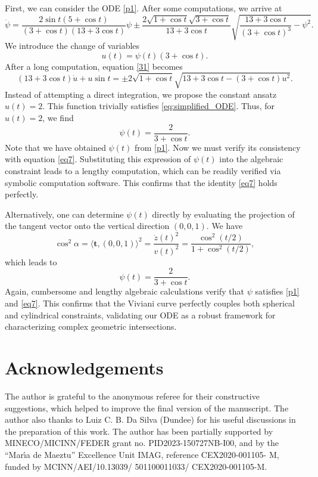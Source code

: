 \documentclass[a4paper,12pt]{amsart}
\theoremstyle{plain}
\theoremstyle{definition}
\newcommand{\bft}{\mathbf{t}}
\begin{document}
First, we can consider the ODE \eqref{p1}. After some computations, we arrive at 
\begin{equation} \label{31}
    \dot{\psi} = \frac{2\sin t (5 + \cos t)}{(3 + \cos t)(13 + 3\cos t)} \psi \pm \frac{2 \sqrt{1 + \cos t} \sqrt{3 + \cos t}}{13 + 3\cos t} \sqrt{ \frac{13 + 3\cos t}{(3 + \cos t)^3} - \psi^2 }.
\end{equation}
We introduce the change of variables 
$$u(t)=\psi(t)(3+\cos t).$$
After a long computation, equation   \eqref{31} becomes 
\begin{equation} \label{eq:simplified_ODE}
    (13 + 3\cos t)\dot{u} + u\sin t = \pm 2\sqrt{1 + \cos t} \sqrt{ 13 + 3\cos t - (3 + \cos t)u^2 }.
\end{equation} 
 Instead of attempting a direct integration, we propose the constant  ansatz    $u(t) = 2$. This function trivially satisfies \eqref{eq:simplified_ODE}.  Thus, for $u(t)=2$, we find
\begin{equation*}
    \psi(t) = \frac{2}{3 + \cos t}.
\end{equation*}
Note that we have obtained $\psi(t)$ from \eqref{p1}. Now we must verify its consistency with equation \eqref{eq7}. Substituting this expression of $\psi(t)$ into the algebraic constraint leads to a lengthy computation, which can be readily verified via symbolic computation software. This confirms that the identity \eqref{eq7} holds perfectly.

Alternatively,   one can determine $\psi(t)$ directly  by evaluating the projection of the tangent vector onto the vertical direction $(0,0,1)$. We have 
\begin{equation*}
    \cos^2 \alpha = \langle \bft, (0,0,1) \rangle^2 = \frac{\dot{z}(t)^2}{v(t)^2} = \frac{\cos^2(t/2)}{1 + \cos^2(t/2)},
\end{equation*}
which leads to 
\[     \psi(t) =  \frac{2}{3 + \cos t}.\]
  Again,     cumbersome and lengthy algebraic calculations verify that $\psi$ satisfies \eqref{p1} and \eqref{eq7}.  
 This  confirms that the Viviani curve perfectly couples both spherical and cylindrical constraints, validating our ODE as a robust framework for characterizing complex geometric intersections.
   
   
  

\section*{Acknowledgements}
The author is   grateful to the anonymous referee for their constructive suggestions, which helped to  improve the final version of the manuscript.  The author also thanks to Luiz C. B. Da Silva (Dundee) for his useful discussions in the preparation of this work. The author   has been partially supported by MINECO/MICINN/FEDER grant no. PID2023-150727NB-I00,  and by the ``Mar\'{\i}a de Maeztu'' Excellence Unit IMAG, reference CEX2020-001105- M, funded by MCINN/AEI/10.13039/ 501100011033/ CEX2020-001105-M.
 
\end{document}
